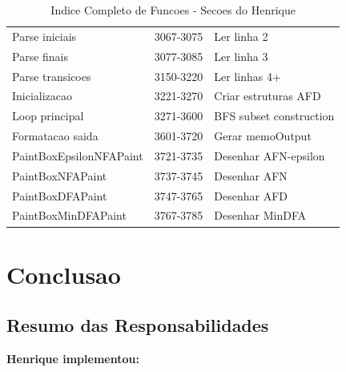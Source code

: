 \documentclass[12pt,a4paper]{article}
\begin{document}
\begin{table}[h]
\begin{tabular}{|l|c|p{6cm}|}
Parse iniciais & 3067-3075 & Ler linha 2 \\
Parse finais & 3077-3085 & Ler linha 3 \\
Parse transicoes & 3150-3220 & Ler linhas 4+ \\
Inicializacao & 3221-3270 & Criar estruturas AFD \\
Loop principal & 3271-3600 & BFS subset construction \\
Formatacao saida & 3601-3720 & Gerar memoOutput \\
PaintBoxEpsilonNFAPaint & 3721-3735 & Desenhar AFN-epsilon \\
PaintBoxNFAPaint & 3737-3745 & Desenhar AFN \\
PaintBoxDFAPaint & 3747-3765 & Desenhar AFD \\
PaintBoxMinDFAPaint & 3767-3785 & Desenhar MinDFA \\
\hline
\end{tabular}
\caption{Indice Completo de Funcoes - Secoes do Henrique}
\end{table}

\newpage
\section{Conclusao}

\subsection{Resumo das Responsabilidades}

\textbf{Henrique implementou:}
\end{document}
